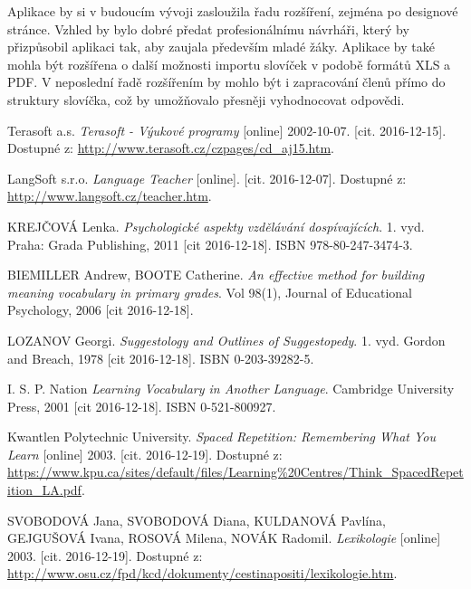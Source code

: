 \documentclass[a4paper,11pt,titlepage,fleqn]{article}
\begin{document}
    Aplikace by si v budoucím vývoji zasloužila řadu rozšíření, zejména po designové stránce. Vzhled by bylo dobré předat profesionálnímu návrháři, který by přizpůsobil aplikaci tak, aby zaujala především mladé žáky. Aplikace by také mohla být rozšířena o další možnosti importu slovíček v podobě formátů XLS a PDF. V neposlední řadě rozšířením by mohlo být i zapracování členů přímo do struktury slovíčka, což by umožňovalo přesněji vyhodnocovat odpovědi.


\newpage
\begin{thebibliography}{99}
    

        Terasoft a.s. \textit{Terasoft - Výukové programy} [online] 2002-10-07. [cit. 2016-12-15]. Dostupné z: \url{http://www.terasoft.cz/czpages/cd_aj15.htm}.
    
        LangSoft s.r.o. \textit{Language Teacher} [online]. [cit. 2016-12-07]. Dostupné z: \url{http://www.langsoft.cz/teacher.htm}.

        KREJČOVÁ Lenka. \textit{Psychologické aspekty vzdělávání dospívajících}. 1. vyd. Praha: Grada Publishing, 2011 [cit 2016-12-18]. ISBN 978-80-247-3474-3.

        BIEMILLER Andrew, BOOTE Catherine. \textit{An effective method for building meaning vocabulary in primary grades}. Vol 98(1), Journal of Educational Psychology, 2006 [cit 2016-12-18].

        LOZANOV Georgi. \textit{Suggestology and Outlines of Suggestopedy}. 1. vyd. Gordon and Breach, 1978 [cit 2016-12-18]. ISBN 0-203-39282-5.

        I. S. P. Nation \textit{Learning Vocabulary in Another Language}. Cambridge University Press, 2001 [cit 2016-12-18]. ISBN 0-521-800927.

        Kwantlen Polytechnic University. \textit{Spaced Repetition: Remembering What You Learn} [online] 2003. [cit. 2016-12-19]. Dostupné z: \url{https://www.kpu.ca/sites/default/files/Learning%20Centres/Think_SpacedRepetition_LA.pdf}.

        SVOBODOVÁ Jana, SVOBODOVÁ Diana, KULDANOVÁ Pavlína, GEJGUŠOVÁ Ivana, ROSOVÁ Milena, NOVÁK Radomil. \textit{Lexikologie} [online] 2003. [cit. 2016-12-19]. Dostupné z: \url{http://www.osu.cz/fpd/kcd/dokumenty/cestinapositi/lexikologie.htm}.


\end{thebibliography}
\end{document}
